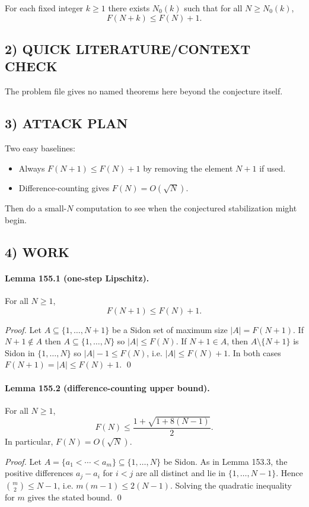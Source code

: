 \medskip
\noindent For each fixed integer $k\ge 1$ there exists $N_0(k)$ such that for all $N\ge N_0(k)$,
\[
F(N+k)\le F(N)+1.
\]

\subsection*{2) QUICK LITERATURE/CONTEXT CHECK}
The problem file gives no named theorems here beyond the conjecture itself.

\subsection*{3) ATTACK PLAN}
Two easy baselines:
\begin{itemize}
\item Always $F(N+1)\le F(N)+1$ by removing the element $N+1$ if used.
\item Difference-counting gives $F(N)=O(\sqrt N)$.
\end{itemize}
Then do a small-$N$ computation to see when the conjectured stabilization might begin.

\subsection*{4) WORK}
\paragraph{Lemma 155.1 (one-step Lipschitz).}
For all $N\ge 1$,
\[
F(N+1)\le F(N)+1.
\]

\textit{Proof.}
Let $A\subseteq\{1,\dots,N+1\}$ be a Sidon set of maximum size $|A|=F(N+1)$. If $N+1\notin A$ then $A\subseteq\{1,\dots,N\}$ so $|A|\le F(N)$.
If $N+1\in A$, then $A\setminus\{N+1\}$ is Sidon in $\{1,\dots,N\}$ so $|A|-1\le F(N)$, i.e. $|A|\le F(N)+1$.
In both cases $F(N+1)=|A|\le F(N)+1$. \qed

\paragraph{Lemma 155.2 (difference-counting upper bound).}
For all $N\ge 1$,
\[
F(N)\le \frac{1+\sqrt{1+8(N-1)}}{2}.
\]
In particular, $F(N)=O(\sqrt N)$.

\textit{Proof.}
Let $A=\{a_1<\cdots<a_m\}\subseteq\{1,\dots,N\}$ be Sidon. As in Lemma 153.3, the positive differences $a_j-a_i$ for $i<j$ are all distinct and lie in $\{1,\dots,N-1\}$.
Hence $\binom{m}{2}\le N-1$, i.e.
$m(m-1)\le 2(N-1)$. Solving the quadratic inequality for $m$ gives the stated bound. \qed

